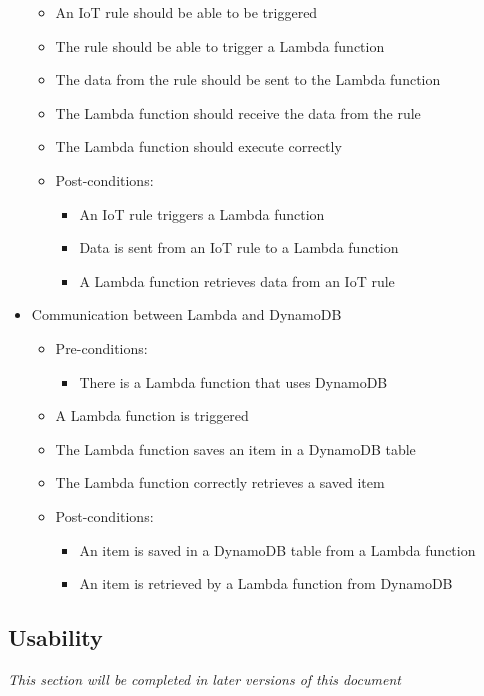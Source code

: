 \documentclass{article}
\begin{document}
\begin{itemize}
\begin{itemize}
\begin{itemize}
			\end{itemize}
			\item An IoT rule should be able to be triggered
			\item The rule should be able to trigger a Lambda function
			\item The data from the rule should be sent to the Lambda function 
			\item The Lambda function should receive the data from the rule
			\item The Lambda function should execute correctly
			\item Post-conditions:
			\begin{itemize}
				\item An IoT rule triggers a Lambda function
				\item Data is sent from an IoT rule to a Lambda function
				\item A Lambda function retrieves data from an IoT rule
			\end{itemize}
		\end{itemize}
		
		\item{Communication between Lambda and DynamoDB}
		\begin{itemize}
			\item Pre-conditions: 
			\begin{itemize}
				\item There is a Lambda function that uses DynamoDB
			\end{itemize}
			\item A Lambda function is triggered
			\item The Lambda function saves an item in a DynamoDB table
			\item The Lambda function correctly retrieves a saved item
			\item Post-conditions:
			\begin{itemize}
				\item An item is saved in a DynamoDB table from a Lambda function
				\item An item is retrieved by a Lambda function from DynamoDB
			\end{itemize}
		\end{itemize}
	\end{itemize}

	\subsection{Usability}
		\textit{This section will be completed in later versions of this document}
\end{document}
